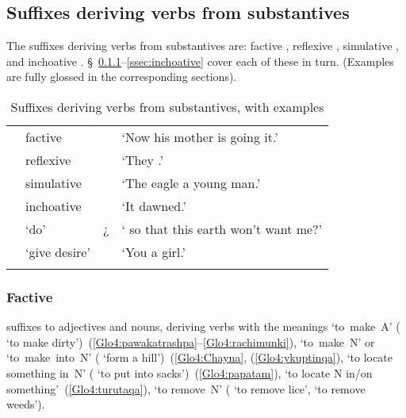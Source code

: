 \subsection{Suffixes deriving verbs from substantives}\label{ssec:ADVS}
The suffixes deriving verbs from substantives are: factive , reflexive , simulative , and inchoative . §~\ref{ssec:factive}--\ref{ssec:inchoative} cover each of these in turn. (Examples are fully glossed in the corresponding sections).

\begin{table}[!ht]
\small\centering
\caption{Suffixes deriving verbs from substantives, with examples}\label{Tab26}
\begin{tabularx}{\textwidth}{l@{~}lL@{~}L}
\lsptoprule
{}	& factive 		& {} & ‘Now his mother is going  it.’		\\[0.5ex]
{}		& reflexive 	& {} & ‘They .’		\\[0.5ex]
{}	& simulative 	& {} & ‘The eagle  a young man.’		\\[0.5ex]
{}		& inchoative 	& {} & ‘It dawned.’		\\[0.5ex]
{}		& ‘do’			& {¿} & ‘ so that this earth won’t want me?’	\\[0.5ex]
{}	& ‘give desire’ & {} & ‘You  a girl.’	\\
\lspbottomrule
\end{tabularx}
\end{table}

\subsubsection{Factive }\label{ssec:factive}
 suffixes to adjectives and nouns, deriving verbs with the meanings ‘to~make~A’ ( ‘to make dirty’)~(\ref{Glo4:pawakatrashpa}--\ref{Glo4:rachimunki}), ‘to~make~N’ or ‘to~make~into~N’ ( ‘form a hill’)~(\ref{Glo4:Chayna}, (\ref{Glo4:ykuptinqa}), ‘to locate something in~N’ ( ‘to put into sacks’)~(\ref{Glo4:papatam}), ‘to locate N in/on something’~(\ref{Glo4:turutaqa}), ‘to remove~N’ ( ‘to remove lice’,  ‘to remove weeds’).\\

